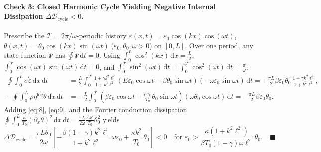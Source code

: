 \documentclass[10pt,a4paper]{article}
\newcommand{\dd}{\,\mathrm{d}}
\begin{document}
\paragraph{Check 3: Closed Harmonic Cycle Yielding Negative Internal Dissipation $\Delta\mathcal{D}_{\mathrm{cycle}} < 0$.}
Prescribe the $\mathcal{T} = 2\pi/\omega$-periodic history $\varepsilon(x,t) = \varepsilon_0\cos(kx)\cos(\omega t)$, $\theta(x,t) = \theta_0\cos(kx)\sin(\omega t)$ ($\varepsilon_0,\theta_0,\omega > 0$) on $[0,L]$. Over one period, any state function $\Psi$ has $\oint \dot{\Psi}\dd t = 0$. Using $\int_0^L \cos^2(kx)\dd x = \frac{L}{2}$, $\int_0^{\mathcal{T}}\cos(\omega t)\sin(\omega t)\dd t = 0$, and $\int_0^{\mathcal{T}}\sin^2(\omega t)\dd t = \int_0^{\mathcal{T}}\cos^2(\omega t)\dd t = \frac{\pi}{\omega}$:
\begin{align}
  \oint\int_0^L \sigma\dot{\varepsilon}\dd x\dd t &= \frac{L}{2}\int_0^{\mathcal{T}} \frac{1+\gamma k^2\ell^2}{1+k^2\ell^2}\left(E\varepsilon_0\cos\omega t - \beta\theta_0\sin\omega t\right)(-\omega\varepsilon_0\sin\omega t)\dd t = +\frac{\pi L}{2}\beta\varepsilon_0\theta_0\,\frac{1+\gamma k^2\ell^2}{1+k^2\ell^2},\label{eq:8}\\
  -\oint\int_0^L \rho\eta^{\mathrm{loc}}\dot{\theta}\dd x\dd t &= -\frac{L}{2}\int_0^{\mathcal{T}} \left(\beta\varepsilon_0\cos\omega t + \frac{\rho c_E}{T_0}\theta_0\sin\omega t\right)(\omega\theta_0\cos\omega t)\dd t = -\frac{\pi L}{2}\beta\varepsilon_0\theta_0.\label{eq:9}
\end{align}
Adding \eqref{eq:8}, \eqref{eq:9}, and the Fourier conduction dissipation $\oint\int_0^L \frac{\kappa}{T_0}(\partial_x\theta)^2\dd x\dd t = \frac{\pi L}{2\omega}\frac{\kappa k^2}{T_0}\theta_0^2$ yields
\begin{equation}
  \Delta\mathcal{D}_{\mathrm{cycle}} = \frac{\pi L\theta_0}{2\omega}\left[-\frac{\beta(1-\gamma)k^2\ell^2}{1 + k^2\ell^2}\,\omega\varepsilon_0 + \frac{\kappa k^2}{T_0}\,\theta_0\right] < 0 \quad \text{for } \varepsilon_0 > \frac{\kappa(1 + k^2\ell^2)}{\beta T_0(1-\gamma)\omega\ell^2}\,\theta_0. \quad \blacksquare\label{eq:10}
\end{equation}
\end{document}
